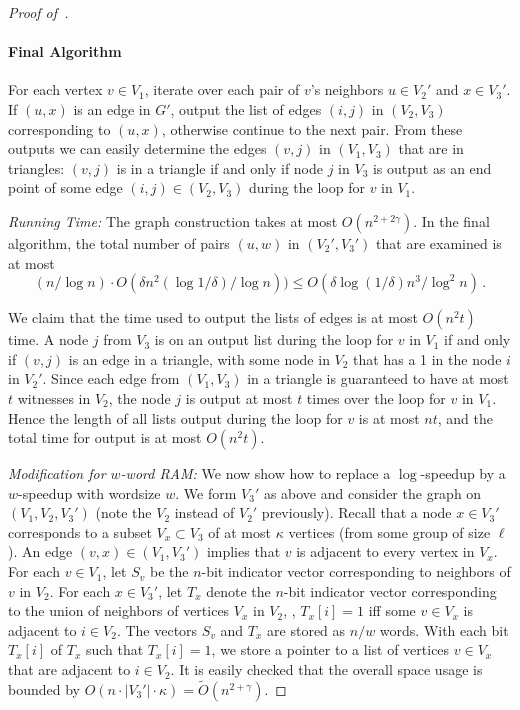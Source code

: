 \begin{proof}[Proof of~]
\paragraph{Final Algorithm} For each vertex $v \in V_1$, iterate over each pair of $v$'s neighbors $u \in V_2'$ and $x \in V_3'$. If $(u,x)$ is an edge in $G'$, output the list of edges  $(i,j)$ in $(V_2,V_3)$ corresponding to $(u,x)$, otherwise continue to the next pair. From these outputs we can easily determine the edges $(v,j)$ in $(V_1,V_3)$
that are in triangles: $(v,j)$ is in a triangle if and only if node $j$ in $V_3$ is output as an end point of some edge $(i,j) \in (V_2,V_3)$ during the loop for $v$ in $V_1$.

\smallskip
\noindent
\emph{Running Time:} The graph construction takes at most $O(n^{2+2\gamma})$. In the final algorithm, the total number of pairs $(u,w)$ in $(V_2',V_3')$ that are examined is at most \[(n/\log n) \cdot O(\delta n^2 (\log 1/\delta)/ \log n)) \leq O(\delta \log (1/\delta) n^3/\log^2 n)\,.\]

We claim that the time used to output the lists of edges is at most $O(n^2 t)$ time. A node $j$ from $V_3$ is on an output list during the loop for $v$ in $V_1$ if and only if $(v,j)$ is an edge in a triangle, with some node in $V_2$ that has a 1 in the node $i$ in $V_2'$. Since each edge from $(V_1,V_3)$ in a triangle is guaranteed to have at most $t$ witnesses in $V_2$, the node $j$ is output at most $t$ times over the loop for $v$ in $V_1$. Hence the length of all lists output during the loop for $v$ is at most $nt$, and the total time for output is at most $O(n^2 t)$.

\smallskip
\noindent
\emph{Modification for $w$-word RAM:} We now show how to replace a $\log$-speedup by a $w$-speedup with wordsize $w$.
We form $V_3'$ as above and consider the graph on $(V_1,V_2,V_3')$ (note the $V_2$ instead of $V_2'$ previously).
Recall that a node $x \in V_3'$ corresponds to a subset $V_x \subset V_3$ of at most $\kappa$ vertices (from some group of size $\ell$).
An edge $(v,x) \in (V_1,V_3')$ implies that $v$ is adjacent to every vertex in $V_x$.
For each $v \in V_1$, let $S_v$ be the $n$-bit indicator vector corresponding to neighbors of $v$ in $V_2$. For each
$x \in V_3'$, let $T_x$ denote the $n$-bit indicator vector corresponding to the union of neighbors of vertices $V_x$ in $V_2$, \ie, $T_x[i]=1$  iff some $v \in V_x$ is adjacent to $i\in V_2$.
The vectors $S_v$ and $T_x$ are stored as $n/w$ words.  With each bit $T_x[i]$ of $T_x$ such that $T_x[i]=1$, we store a pointer to a list of vertices $v \in V_x$  that are adjacent to  $i \in V_2$. It is easily checked that the overall space usage is bounded by  $O(n \cdot |V_3'| \cdot \kappa) = \tilde{O}(n^{2+\gamma})$.


\end{proof}
